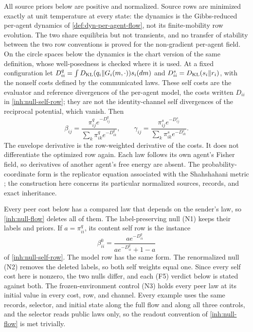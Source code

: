 All source priors below are positive and normalized. Source rows are minimized exactly at unit temperature at every state: the dynamics is the Gibbs-reduced per-agent dynamics of \cref{def:dyn-per-agent-flow}, not its finite-mobility row evolution. The two share equilibria but not transients, and no transfer of stability between the two row conventions is proved for the non-gradient per-agent field. On the circle spaces below the dynamics is the chart version of the same definition, whose well-posedness is checked where it is used. At a fixed configuration let $D^q_{ii}=\int D_{\mathrm{KL}}(q_i\Vert G_i(m,\cdot))s_i(dm)$ and $D^s_{ii}=D_{\mathrm{KL}}(s_i\Vert r_i)$, with the nonself costs defined by the communicated laws. These self costs are the evaluator and reference divergences of the per-agent model, the costs written $D_{ii}$ in \cref{inh:null-self-row}; they are not the identity-channel self divergences of the reciprocal potential, which vanish. Then
\begin{equation}
 \beta_{ij}=\frac{\pi^q_{ij}e^{-D^q_{ij}}}{\sum_k\pi^q_{ik}e^{-D^q_{ik}}},
 \qquad
 \gamma_{ij}=\frac{\pi^s_{ij}e^{-D^s_{ij}}}{\sum_k\pi^s_{ik}e^{-D^s_{ik}}}.
 \label{pa:rows}
\end{equation}
The envelope derivative is the row-weighted derivative of the costs. It does not differentiate the optimized row again. Each law follows its own agent's Fisher field, so derivatives of another agent's free energy are absent. The probability-coordinate form is the replicator equation associated with the Shahshahani metric \citep{Shahshahani1979}; the construction here concerns its particular normalized sources, records, and exact inheritance.

Every peer cost below has a compared law that depends on the sender's law, so \cref{inh:null-flow} deletes all of them. The label-preserving null (N1) keeps their labels and priors. If $a=\pi^q_{ii}$, its content self row is the instance
\begin{equation}
 \beta^0_{ii}=\frac{a e^{-D^q_{ii}}}{a e^{-D^q_{ii}}+1-a}
 \label{pa:null-row}
\end{equation}
of \cref{inh:null-self-row}. The model row has the same form. The renormalized null (N2) removes the deleted labels, so both self weights equal one. Since every self cost here is nonzero, the two nulls differ, and each (F5) verdict below is stated against both. The frozen-environment control (N3) holds every peer law at its initial value in every cost, row, and channel. Every example uses the same records, selector, and initial state along the full flow and along all three controls, and the selector reads public laws only, so the readout convention of \cref{inh:null-flow} is met trivially.

